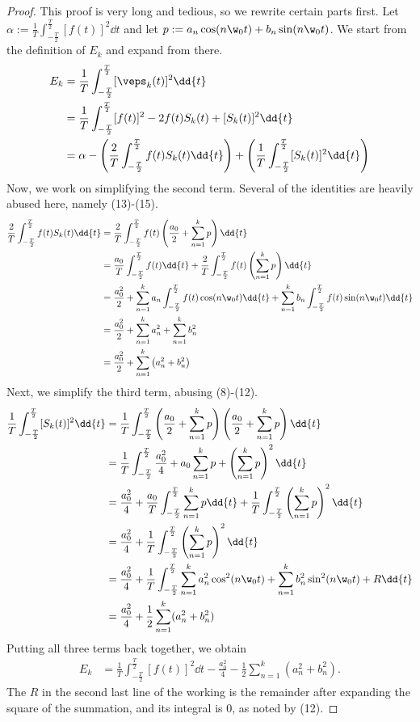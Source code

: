 \begin{proof} This proof is very long and tedious, so we rewrite certain parts first. Let $\alpha:=\frac 1T\int_{-\frac T2}^{\frac T2}[f(t)]^2\dd{t}$ and let $p:=a_n\cos(n\w_0t)+b_n\sin(n\w_0t)$. We start from the definition of $E_k$ and expand from there.
\begin{align*}
E_k &= \frac 1T\int_{-\frac T2}^{\frac T2}[\veps_k(t)]^2\dd{t} \\ &= \frac1T\int_{-\frac T2}^{\frac T2}[f(t)]^2-2f(t)S_k(t)+[S_k(t)]^2\dd{t} \\ &= \alpha-\left(\frac2T\int_{-\frac T2}^{\frac T2}f(t)S_k(t)\dd{t}\right)+\left(\frac1T\int_{-\frac T2}^{\frac T2}[S_k(t)]^2\dd{t}\right)
\end{align*}
Now, we work on simplifying the second term. Several of the identities are heavily abused here, namely (13)-(15).
\begin{align*}
\frac2T\int_{-\frac T2}^{\frac T2}f(t)S_k(t)\dd{t} &= \frac2T\int_{-\frac T2}^{\frac T2}f(t)\left(\frac{a_0}{2}+\sum_{n=1}^kp\right)\dd{t} \\ &= \frac{a_0}{T}\int_{-\frac T2}^{\frac T2}f(t)\dd{t}+\frac2T\int_{-\frac T2}^{\frac T2}f(t)\left(\sum_{n=1}^kp\right)\dd{t} \\ &= \frac{a_0^2}{2}+\sum_{n=1}^ka_n\int_{-\frac T2}^{\frac T2}f(t)\cos(n\w_0t)\dd{t}+\sum_{n=1}^kb_n\int_{-\frac T2}^{\frac T2}f(t)\sin(n\w_0t)\dd{t} \\ &= \frac{a_0^2}{2}+\sum_{n=1}^ka_n^2+\sum_{n=1}^kb_n^2 \\ &= \frac{a_0^2}{2}+\sum_{n=1}^k\left(a_n^2+b_n^2\right)
\end{align*}
Next, we simplify the third term, abusing (8)-(12).
\begin{align*}
\frac1T\int_{-\frac T2}^{\frac T2}[S_k(t)]^2\dd{t} &= \frac1T\int_{-\frac T2}^{\frac T2}\left(\frac{a_0}{2}+\sum_{n=1}^kp\right)\left(\frac{a_0}{2}+\sum_{n=1}^kp\right)\dd{t} \\ &= \frac1T\int_{-\frac T2}^{\frac T2}\frac{a_0^2}{4}+a_0\sum_{n=1}^kp+\left(\sum_{n=1}^kp\right)^2\dd{t} \\ &= \frac{a_0^2}{4}+\frac{a_0}{T}\int_{-\frac T2}^{\frac T2}\sum_{n=1}^kp\dd{t}+\frac1T\int_{-\frac T2}^{\frac T2}\left(\sum_{n=1}^kp\right)^2\dd{t} \\ &= \frac{a_0^2}{4}+\frac1T\int_{-\frac T2}^{\frac T2}\left(\sum_{n=1}^kp\right)^2\dd{t} \\ &= \frac{a_0^2}{4}+\frac1T\int_{-\frac T2}^{\frac T2}\sum_{n=1}^ka_n^2\cos^2(n\w_0t)+\sum_{n=1}^kb_n^2\sin^2(n\w_0t)+R\dd{t} \\ &= \frac{a_0^2}{4}+\frac12\sum_{n=1}^k(a_n^2+b_n^2)
\end{align*}
Putting all three terms back together, we obtain
\begin{align*}
E_k &= \frac 1T\int_{-\frac T2}^{\frac T2}[f(t)]^2\dd{t}-\frac{a_0^2}{4}-\frac12\sum_{n=1}^k(a_n^2+b_n^2).
\end{align*}
The $R$ in the second last line of the working is the remainder after expanding the square of the summation, and its integral is $0$, as noted by (12).
\end{proof}

